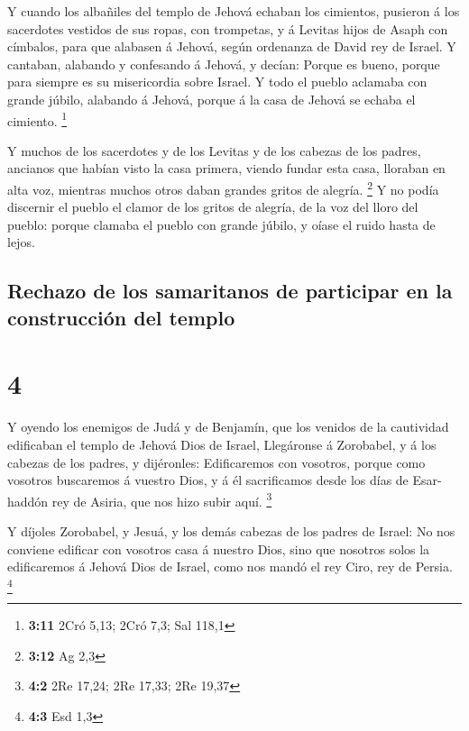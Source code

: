  Y cuando los albañiles del templo de Jehová echaban los
cimientos, pusieron á los sacerdotes vestidos de sus ropas, con
trompetas, y á Levitas hijos de Asaph con címbalos, para que alabasen á
Jehová, según ordenanza de David rey de Israel.  Y
cantaban, alabando y confesando á Jehová, y decían: Porque es bueno,
porque para siempre es su misericordia sobre Israel. Y todo el pueblo
aclamaba con grande júbilo, alabando á Jehová, porque á la casa de
Jehová se echaba el cimiento. \footnote{\textbf{3:11} 2Cró 5,13; 2Cró
  7,3; Sal 118,1}

 Y muchos de los sacerdotes y de los Levitas y de los
cabezas de los padres, ancianos que habían visto la casa primera, viendo
fundar esta casa, lloraban en alta voz, mientras muchos otros daban
grandes gritos de alegría. \footnote{\textbf{3:12} Ag 2,3} 
Y no podía discernir el pueblo el clamor de los gritos de alegría, de la
voz del lloro del pueblo: porque clamaba el pueblo con grande júbilo, y
oíase el ruido hasta de lejos.

\hypertarget{rechazo-de-los-samaritanos-de-participar-en-la-construcciuxf3n-del-templo}{%
\subsection{Rechazo de los samaritanos de participar en la construcción
del
templo}\label{rechazo-de-los-samaritanos-de-participar-en-la-construcciuxf3n-del-templo}}

\hypertarget{section-3}{%
\section{4}\label{section-3}}

 Y oyendo los enemigos de Judá y de Benjamín, que los
venidos de la cautividad edificaban el templo de Jehová Dios de Israel,
 Llegáronse á Zorobabel, y á los cabezas de los padres, y
dijéronles: Edificaremos con vosotros, porque como vosotros buscaremos á
vuestro Dios, y á él sacrificamos desde los días de Esar-haddón rey de
Asiria, que nos hizo subir aquí. \footnote{\textbf{4:2} 2Re 17,24; 2Re
  17,33; 2Re 19,37}

 Y díjoles Zorobabel, y Jesuá, y los demás cabezas de los
padres de Israel: No nos conviene edificar con vosotros casa á nuestro
Dios, sino que nosotros solos la edificaremos á Jehová Dios de Israel,
como nos mandó el rey Ciro, rey de Persia. \footnote{\textbf{4:3} Esd
  1,3}

